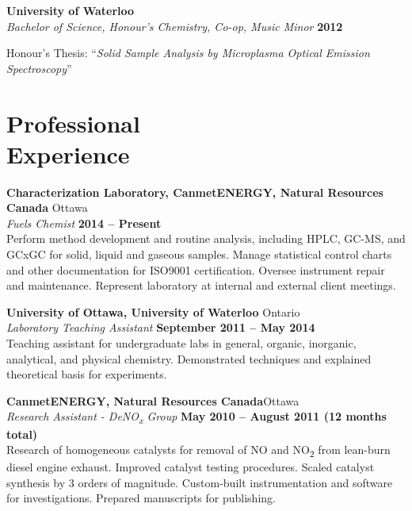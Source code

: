 \documentclass[margin,line]{resume}
\begin{document}
\begin{resume}
    \textbf{University of Waterloo}\\\vspace{1mm}%
    \textsl{Bachelor of Science, Honour's Chemistry, Co-op, Music Minor} \hfill \textbf{2012}\vspace{-3mm}\\\vspace{-1mm}%
    \begin{list2}
        \item Honour's Thesis: ``\textit{Solid Sample Analysis by Microplasma Optical Emission Spectroscopy}''
    \end{list2}

    \section{\mysidestyle Professional\\Experience}

    \textbf{Characterization Laboratory, CanmetENERGY, Natural Resources Canada} \hfill Ottawa \\\vspace{1mm}%
    \textsl{Fuels Chemist} \hfill \textbf{2014 -- Present}\\
    Perform method development and routine analysis, including HPLC, GC-MS, and GCxGC for solid, liquid and gaseous samples.
    Manage statistical control charts and other documentation for ISO9001 certification.
    Oversee instrument repair and maintenance.
    Represent laboratory at internal and external client meetings.
    

    \textbf{University of Ottawa, University of Waterloo} \hfill Ontario \\\vspace{1mm}%
    \textsl{Laboratory Teaching Assistant} \hfill \textbf{September 2011 -- May 2014}\\
    Teaching assistant for undergraduate labs in general, organic, inorganic, analytical, and physical chemistry.
    Demonstrated techniques and explained theoretical basis for experiments.

    \textbf{CanmetENERGY, Natural Resources Canada}\hfill Ottawa \\\vspace{1mm}%
    \textsl{Research Assistant - DeNO\textsubscript{x} Group} \hfill \textbf{May 2010 -- August 2011 (12 months total)}\\
    Research of homogeneous catalysts for removal of NO and NO\textsubscript{2} from lean-burn diesel engine exhaust.
    Improved catalyst testing procedures.
    Scaled catalyst synthesis by 3 orders of magnitude.
    Custom-built instrumentation and software for investigations.
    Prepared manuscripts for publishing.


\end{resume}
\end{document}
